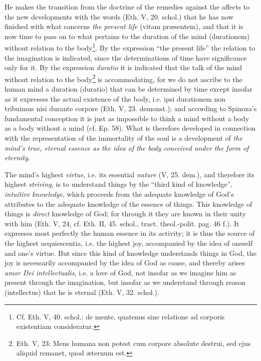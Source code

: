 \documentclass[12pt,a4paper,openany]{book}
\newcommand{\opage}[1]{\marginnote{\footnotesize\textit{[#1]}}}
\begin{document}
He makes the transition from the doctrine of the remedies against
the affects to the new developments with the words (Eth. V, 20.
schol.) that he has now finished with what concerns \emph{the present
life} (vitam præsentem), and that it is now time
to pass on to what pertains to the duration of the mind
(durationem) without relation to the body\footnote{Cf. Eth. V, 40. schol.: de mente, quatenus sine relatione ad corporis existentiam consideratur.}. By the expression
``the present life'' the relation to the imagination is indicated,
since the determinations of time have significance only for
it. By the expression \emph{duratio} it is indicated that the talk
of the mind without relation to the body\footnote{Eth. V, 23: Mens humana non potest cum corpore absolute destrui,
sed ejus aliquid remanet, quod æternum est.} is accommodating,
for we do not ascribe to the human mind a duration
(duratio) that can be determined by time except insofar as it
expresses the actual existence of the body, i.e. ipsi durationem
non tribuimus nisi durante corpore (Eth. V, 23. demonst.);
and according to Spinoza's fundamental conception it is just as impossible
to think a mind without a body as a body without
a mind (cf. Ep. 58). What is therefore developed in connection
with the representation of the immortality of the soul is a
development of \emph{the mind's true, eternal essence as the idea
of the body conceived under the form of eternity.}

The mind's highest \emph{virtue}, i.e. its essential \emph{nature} (V,
25. dem.), and therefore its highest \emph{striving}, is to understand
things by the ``third kind of knowledge'', \emph{intuitive}
\emph{knowledge}, which proceeds from the adequate knowledge
of God's attributes to the adequate knowledge of the essence of
things. This knowledge of things is \emph{direct}
\opage{167}\setcounter{footnote}{0}knowledge of God; for through it they are known in their unity
with him (Eth. V, 24, cf. Eth. II, 45. schol., tract. theol.-polit. pag. 46 f.). It expresses most perfectly the human
essence in its activity; it is thus the source of the
highest acquiescentia, i.e. the highest joy, accompanied by
the idea of oneself and one's virtue. But since this kind of knowledge
understands things in God, the joy is necessarily accompanied by
the idea of God as cause, and thereby arises \emph{amor Dei
intellectualis}, i.e. a love of God, not insofar as
we imagine him as present through the imagination,
but insofar as we understand through reason (intellectus) that he
is eternal (Eth. V, 32. schol.).
\end{document}

